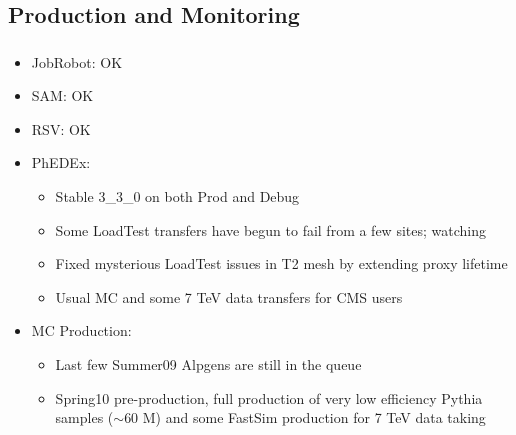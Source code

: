 \documentclass{beamer}
\newcommand{\ca}{\ensuremath{\sim}}
\begin{document}
\subsection{Production and Monitoring}
\begin{frame}
\frametitle{}

\begin{itemize}
	\item JobRobot: OK
	\item SAM: OK
	\item RSV: OK
	\item PhEDEx:
	\begin{itemize}
		\item Stable 3\_3\_0 on both Prod and Debug
		\item Some LoadTest transfers have begun to fail from a few sites; watching
		\item Fixed mysterious LoadTest issues in T2 mesh by extending proxy lifetime
		\item Usual MC and some 7 TeV data transfers for CMS users
	\end{itemize}
	\item MC Production:
	\begin{itemize}
		\item Last few Summer09 Alpgens are still in the queue
		\item Spring10 pre-production, full production of very low efficiency Pythia samples (\ca{}60 M) and some FastSim production for 7 TeV data taking
	\end{itemize}
\end{itemize}
\end{frame}
\end{document}
